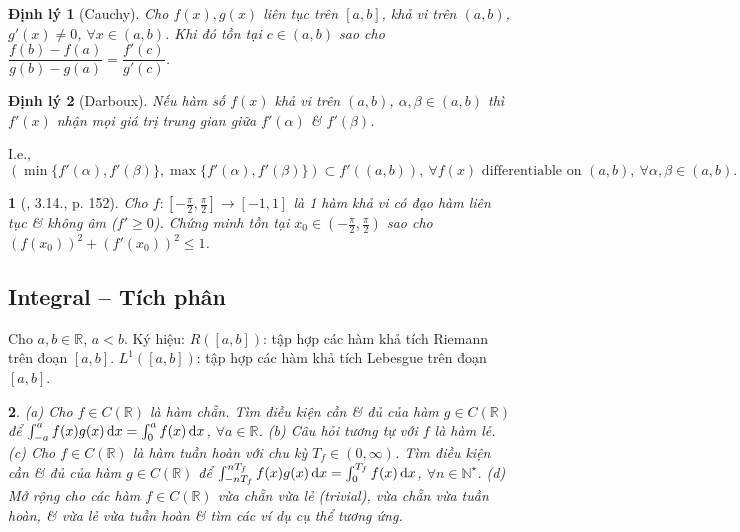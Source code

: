 \documentclass{article}
\newtheorem{baitoan}{}
\newtheorem{dinhly}{Định lý}
\begin{document}
\begin{dinhly}[Cauchy]
	Cho $f(x),g(x)$ liên tục trên $[a,b]$, khả vi trên $(a,b)$, $g'(x)\ne0$, $\forall x\in(a,b)$. Khi đó tồn tại $c\in(a,b)$ sao cho $\dfrac{f(b) - f(a)}{g(b) - g(a)} = \dfrac{f'(c)}{g'(c)}$.
\end{dinhly}

\begin{dinhly}[Darboux]
	Nếu hàm số $f(x)$ khả vi trên $(a,b)$, $\alpha,\beta\in(a,b)$ thì $f'(x)$ nhận mọi giá trị trung gian giữa $f'(\alpha)$ \& $f'(\beta)$.
\end{dinhly}
I.e.,
\begin{equation*}
	(\min\{f'(\alpha),f'(\beta)\},\max\{f'(\alpha),f'(\beta)\})\subset f'((a,b)),\ \forall f(x)\mbox{ differentiable on }(a,b),\ \forall\alpha,\beta\in(a,b).
\end{equation*}

\begin{baitoan}[\cite{Quoc_Long_Dat_Nam_VMC}, 3.14., p. 152]
	Cho $f:\left[-\frac{\pi}{2},\frac{\pi}{2}\right]\to[-1,1]$ là 1 hàm khả vi có đạo hàm liên tục \& không âm ($f'\ge0$). Chứng minh tồn tại $x_0\in\left(-\frac{\pi}{2},\frac{\pi}{2}\right)$ sao cho $(f(x_0))^2 + (f'(x_0))^2\le1$.
\end{baitoan}


\subsection{Integral -- Tích phân}
Cho $a,b\in\mathbb{R}$, $a < b$. Ký hiệu: $R([a,b])$: tập hợp các hàm khả tích Riemann trên đoạn $[a,b]$. $L^1([a,b])$: tập hợp các hàm khả tích Lebesgue trên đoạn $[a,b]$.

\begin{baitoan}
	(a) Cho $f\in C(\mathbb{R})$ là hàm chẵn. Tìm điều kiện cần \& đủ của hàm $g\in C(\mathbb{R})$ để $\int_{-a}^a f(x)g(x)\,{\rm d}x = \int_0^a f(x)\,{\rm d}x$, $\forall a\in\mathbb{R}$. (b) Câu hỏi tương tự với $f$ là hàm lẻ. (c) Cho $f\in C(\mathbb{R})$ là hàm tuần hoàn với chu kỳ $T_f\in(0,\infty)$. Tìm điều kiện cần \& đủ của hàm $g\in C(\mathbb{R})$ để  $\int_{-nT_f}^{nT_f} f(x)g(x)\,{\rm d}x = \int_0^{T_f} f(x)\,{\rm d}x$, $\forall n\in\mathbb{N}^\star$. (d) Mở rộng cho các hàm $f\in C(\mathbb{R})$ vừa chẵn vừa lẻ (trivial), vừa chẵn vừa tuần hoàn, \& vừa lẻ vừa tuần hoàn \& tìm các ví dụ cụ thể tương ứng.
\end{baitoan}
\end{document}
